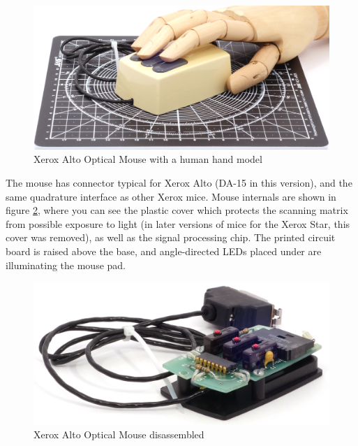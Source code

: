 \documentclass[11pt, a4paper]{article}
\begin{document}
\begin{figure}[h]
    \centering
    \includegraphics[scale=0.4]{1981_xerox_alto_mouse/hand_30.jpg}
    \caption{Xerox Alto Optical Mouse with a human hand model}
    \label{fig:XeroxAltoHand}
\end{figure}

The mouse has connector typical for Xerox Alto (DA-15 in this version), and the same quadrature interface as other Xerox mice. Mouse internals are shown in figure \ref{fig:XeroxAltoInside}, where you can see the plastic cover which protects the scanning matrix from possible exposure to light (in later versions of mice for the Xerox Star, this cover was removed), as well as the signal processing chip. The printed circuit board is raised above the base, and angle-directed LEDs placed under are illuminating the mouse pad.

\begin{figure}[h]
    \centering
    \includegraphics[scale=0.8]{1981_xerox_alto_mouse/inside_60.jpg}
    \caption{Xerox Alto Optical Mouse disassembled}
    \label{fig:XeroxAltoInside}
\end{figure}
\end{document}
